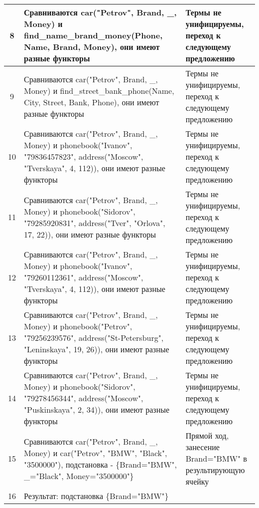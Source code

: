 \documentclass[a4paper,12pt]{article}
\begin{document}
\begin{table}[ht!] 
	\begin{tabularx}{\linewidth}{|c|>{\centering}X|>{\centering}X|}
		\hline
		8 & Сравниваются car("Petrov"{}, Brand, \_, Money) и find\_name\_brand\_money(Phone, Name, Brand, Money), они имеют разные функторы & Термы не унифицируемы, переход к следующему предложению \tabularnewline
		\hline
		9 & Сравниваются car("Petrov"{}, Brand, \_, Money) и find\_street\_bank\_phone(Name, City, Street, Bank, Phone), они имеют разные функторы & Термы не унифицируемы, переход к следующему предложению \tabularnewline
		\hline
		10 & Сравниваются car("Petrov"{}, Brand, \_, Money) и phonebook("Ivanov"{}, "79836457823"{}, address("Moscow"{}, "Tverskaya"{}, 4, 112)), они имеют разные функторы & Термы не унифицируемы, переход к следующему предложению \tabularnewline
		\hline
		11 & Сравниваются car("Petrov"{}, Brand, \_, Money) и phonebook("Sidorov"{}, "79285920831"{}, address("Tver"{}, "Orlova"{}, 17, 22)), они имеют разные функторы & Термы не унифицируемы, переход к следующему предложению\tabularnewline
		\hline
		12 & Сравниваются car("Petrov"{}, Brand, \_, Money) и phonebook("Ivanov"{}, "79260112361"{}, address("Moscow"{}, "Tverskaya"{}, 4, 112)), они имеют разные функторы & Термы не унифицируемы, переход к следующему предложению\tabularnewline
		\hline
		13 & Сравниваются car("Petrov"{}, Brand, \_, Money) и  phonebook("Petrov"{}, "79256239576"{}, address("St-Petersburg"{}, "Leninskaya"{}, 19, 26)), они имеют разные функторы & Термы не унифицируемы, переход к следующему предложению\tabularnewline
		\hline
		14 & Сравниваются car("Petrov"{}, Brand, \_, Money) и  phonebook("Sidorov"{}, "79278456344"{}, address("Moscow"{}, "Puskinskaya"{}, 2, 34)), они имеют разные функторы & Термы не унифицируемы, переход к следующему предложению\tabularnewline
		\hline
		15 & Сравниваются car("Petrov"{}, Brand, \_, Money) и car("Petrov"{}, "BMW"{}, "Black"{}, "3500000"), подстановка - \{Brand="BMW"{}, \_="Black"{}, Money="3500000"\} & Прямой ход, занесение Brand="BMW" в результирующую ячейку \tabularnewline
		\hline
		16 & Результат: подстановка \{Brand="BMW"\} &  \tabularnewline
		\hline
\end{tabularx}
\end{table}
		
\end{document}
